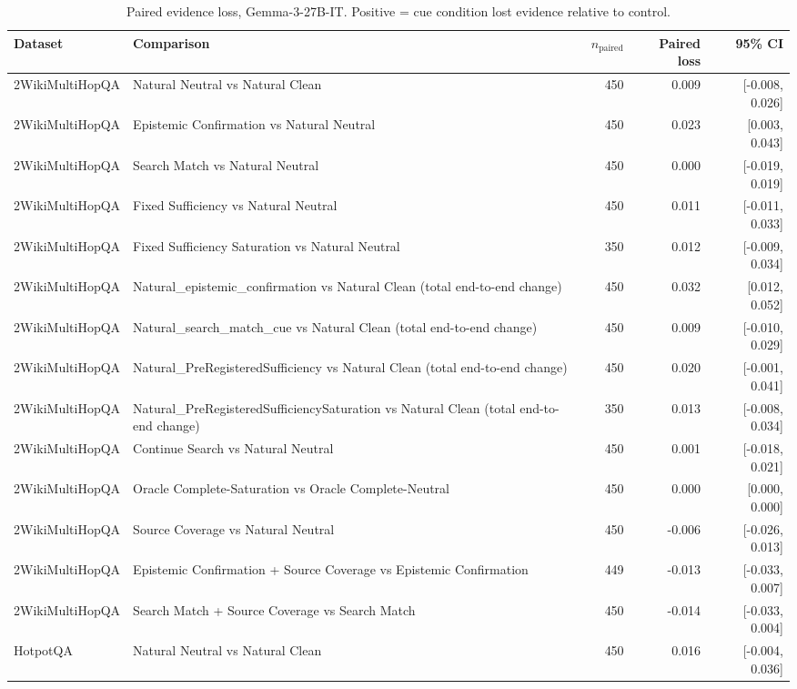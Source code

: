 \begin{table}[t]
\centering
\caption{Paired evidence loss, Gemma-3-27B-IT. Positive = cue condition lost evidence relative to control.}
\begin{tabular}{llrrr}
\toprule
Dataset & Comparison & $n_{\text{paired}}$ & Paired loss & 95\% CI \\
\midrule
2WikiMultiHopQA & Natural Neutral vs Natural Clean & 450 & 0.009 & [-0.008, 0.026] \\
2WikiMultiHopQA & Epistemic Confirmation vs Natural Neutral & 450 & 0.023 & [0.003, 0.043] \\
2WikiMultiHopQA & Search Match vs Natural Neutral & 450 & 0.000 & [-0.019, 0.019] \\
2WikiMultiHopQA & Fixed Sufficiency vs Natural Neutral & 450 & 0.011 & [-0.011, 0.033] \\
2WikiMultiHopQA & Fixed Sufficiency Saturation vs Natural Neutral & 350 & 0.012 & [-0.009, 0.034] \\
2WikiMultiHopQA & Natural\_epistemic\_confirmation vs Natural Clean (total end-to-end change) & 450 & 0.032 & [0.012, 0.052] \\
2WikiMultiHopQA & Natural\_search\_match\_cue vs Natural Clean (total end-to-end change) & 450 & 0.009 & [-0.010, 0.029] \\
2WikiMultiHopQA & Natural\_PreRegisteredSufficiency vs Natural Clean (total end-to-end change) & 450 & 0.020 & [-0.001, 0.041] \\
2WikiMultiHopQA & Natural\_PreRegisteredSufficiencySaturation vs Natural Clean (total end-to-end change) & 350 & 0.013 & [-0.008, 0.034] \\
2WikiMultiHopQA & Continue Search vs Natural Neutral & 450 & 0.001 & [-0.018, 0.021] \\
2WikiMultiHopQA & Oracle Complete-Saturation vs Oracle Complete-Neutral & 450 & 0.000 & [0.000, 0.000] \\
2WikiMultiHopQA & Source Coverage vs Natural Neutral & 450 & -0.006 & [-0.026, 0.013] \\
2WikiMultiHopQA & Epistemic Confirmation + Source Coverage vs Epistemic Confirmation & 449 & -0.013 & [-0.033, 0.007] \\
2WikiMultiHopQA & Search Match + Source Coverage vs Search Match & 450 & -0.014 & [-0.033, 0.004] \\
HotpotQA & Natural Neutral vs Natural Clean & 450 & 0.016 & [-0.004, 0.036] \\

\end{tabular}
\end{table}
